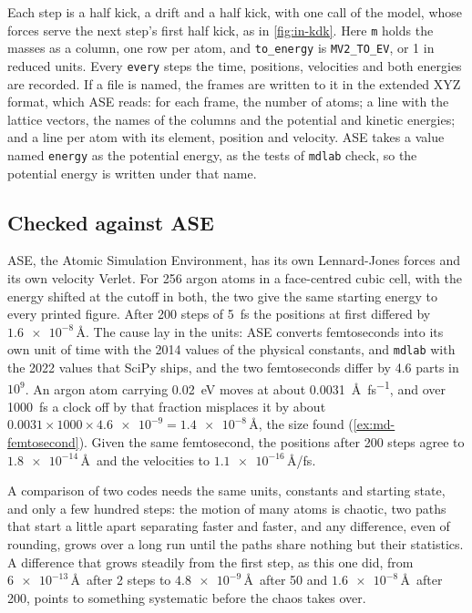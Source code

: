 \noindent Each step is a half kick, a drift and a half kick, with one call
of the model, whose forces serve the next step's first half kick, as in
\cref{fig:in-kdk}. Here \texttt{m} holds the masses as a column, one row
per atom, and \texttt{to\_energy} is \texttt{MV2\_TO\_EV}, or 1 in
reduced units. Every \texttt{every} steps the time, positions, velocities
and both energies are recorded. If a file is named, the frames are written
to it in the extended XYZ format, which ASE reads: for each frame, the
number of atoms; a line with the lattice vectors, the names of the columns
and the potential and kinetic energies; and a line per atom with its
element, position and velocity. ASE takes a value named \texttt{energy}
as the potential energy, as the tests of \texttt{mdlab} check, so the
potential energy is written under that name.

\subsection*{Checked against ASE}

ASE, the Atomic Simulation Environment\cite{Larsen2017}, has its own
Lennard-Jones forces and its own velocity Verlet. For 256 argon atoms in
a face-centred cubic cell, with the energy shifted at the cutoff in both,
the two give the same starting energy to every printed figure. After 200
steps of \SI{5}{\femto\second} the positions at first differed by
$\num{1.6e-8}$\,\AA. The cause lay in the units: ASE converts
femtoseconds into its own unit of time with the 2014 values of the
physical constants, and \texttt{mdlab} with the 2022 values that SciPy
ships, and the two femtoseconds differ by 4.6 parts in $10^9$. An argon
atom carrying \SI{0.02}{\electronvolt} moves at about
\SI{0.0031}{\angstrom\per\femto\second}, and over \SI{1000}{\femto\second}
a clock off by that fraction misplaces it by about $0.0031\times1000
\times\num{4.6e-9} = \num{1.4e-8}$\,\AA, the size found
(\cref{ex:md-femtosecond}). Given the same femtosecond, the positions after
200 steps agree to $\num{1.8e-14}$\,\AA\ and the velocities to
$\num{1.1e-16}$\,\AA/fs.

\begin{practice}
A comparison of two codes needs the same units, constants and starting
state, and only a few hundred steps: the motion of many atoms is chaotic,
two paths that start a little apart separating faster and faster, and any
difference, even of rounding, grows over a long run until the paths share
nothing but their statistics\cite{FrenkelSmit2023}. A difference that
grows steadily from the first step, as this one did, from
$\num{6e-13}$\,\AA\ after 2 steps to $\num{4.8e-9}$\,\AA\ after 50 and
$\num{1.6e-8}$\,\AA\ after 200, points to something systematic before
the chaos takes over.
\end{practice}


